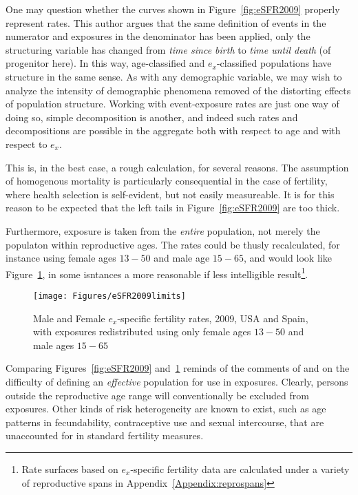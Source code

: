 One may question whether the curves shown in Figure~\ref{fig:eSFR2009} properly
represent rates. This author argues that the same definition of events in the
numerator and exposures in the denominator has been applied, only the
structuring variable has changed from \textit{time since birth} to \textit{time
until death} (of progenitor here). In this way, age-classified and
$e_x$-classified populations have structure in the same sense. As with any
demographic variable, we may wish to analyze the intensity of demographic
phenomena removed of the distorting effects of population structure.
Working with event-exposure rates are just one way of doing so, simple
decomposition is another, and indeed such rates and decompositions are possible
in the aggregate both with respect to age and with respect to
$e_x$.

This is, in the best case, a rough calculation, for several reasons. The
assumption of homogenous mortality is particularly consequential in the case of 
fertility, where health selection is self-evident, but not easily measureable.
It is for this reason to be expected that the left tails in
Figure~\ref{fig:eSFR2009} are too thick. 

Furthermore, exposure is taken from the \textit{entire} population, not merely
the populaton within reproductive ages. The rates could be thusly recalculated,
for instance using female ages $13-50$ and male age $15-65$, and would look like 
Figure~\ref{fig:eSFR2009limits}, in some isntances a more reasonable if less
intelligible result\footnote{Rate surfaces based on $e_x$-specific fertility
data are calculated under a variety of reproductive spans in
Appendix~\ref{Appendix:reprospans}}.

\begin{figure}[ht!]
        \centering  
          \caption{Male and Female $e_x$-specific fertility rates, 2009, USA and
          Spain, with exposures redistributed using only female ages $13-50$ and
          male ages $15-65$}
          \texttt{[image: Figures/eSFR2009limits]}
          \label{fig:eSFR2009limits}
\end{figure}

Comparing Figures~\ref{fig:eSFR2009} and~\ref{fig:eSFR2009limits} reminds of the
comments of \citet{gupta1978alternative} and \citet{mitra1976effect} on the difficulty of
defining an \textit{effective} population for use in exposures. Clearly, persons
outside the reproductive age range will conventionally be excluded from
exposures. Other kinds of risk heterogeneity are known to exist, such as age
patterns in fecundability, contraceptive use and sexual intercourse, that are
unaccounted for in standard fertility measures. 

